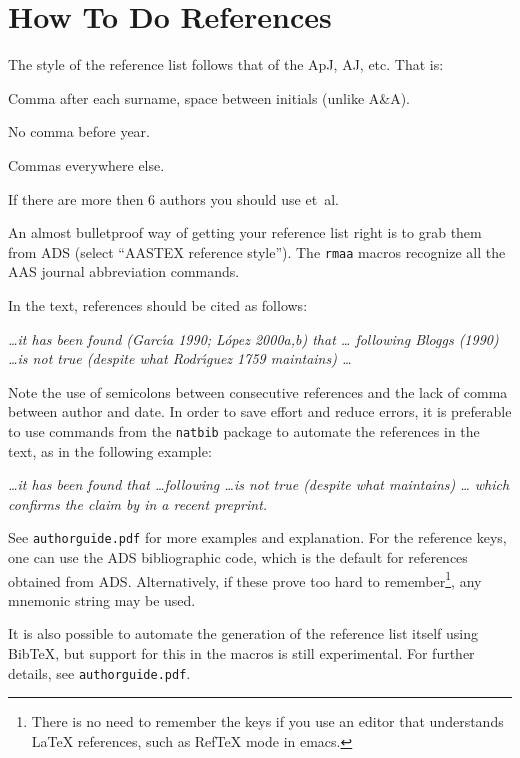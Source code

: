 \documentclass[debug]{rmxaa}
\newenvironment{Example}
{\begin{list}{}{\setlength{\leftmargin}{10pt}\setlength{\rightmargin}{10pt}}%
  \item[]\itshape}
  {\end{list}}
\begin{document}
\section{How To Do References}
\label{sec:refs}

The style of the reference list follows that of the ApJ, AJ, etc. That
is:
\begin{compactitem}
\item Comma after each surname, space between initials (unlike A\&A).
\item No comma before year.
\item Commas everywhere else. 
\item If there are more then 6 authors you should use et~al.
\end{compactitem}
An almost bulletproof way of getting your reference list right is to
grab them from ADS (select ``AASTEX reference style''). The
\texttt{rmaa} macros recognize all the AAS journal abbreviation
commands. 

In the text, references should be cited as follows: 
\begin{Example}
  \dots it has been found (Garc\'\i{}a 1990; L\'opez 2000a,b) that \dots
  following Bloggs (1990) \dots is not true (despite what
  Rodr\'\i{}guez 1759 maintains) \dots
\end{Example}
Note the use of semicolons between consecutive references and the lack
of comma between author and date. In order to save effort and reduce
errors, it is preferable to use commands from the \texttt{natbib}
package to automate the references in the text, as in the following
example:
\begin{Example}
  \dots it has been found \citep{Arthur:2006a, Lazarian:2019a,
    Alarie:2019a} that \dots following \citet{Baldwin:1991a} \dots is
  not true (despite what \citealp{Stromgren:1939a} maintains) \dots
  which confirms the claim by \citeauthor{Chau-Giang:2019a} in a
  recent preprint.
\end{Example}
See \texttt{authorguide.pdf} for more examples and explanation.  For
the reference keys, one can use the ADS bibliographic code, which is
the default for references obtained from ADS. Alternatively, if these
prove too hard to remember\footnote{There is no need to remember the
  keys if you use an editor that understands \LaTeX{} references, such
  as RefTeX mode in emacs.}, any mnemonic string may be used.

It is also possible to automate the generation of the reference list
itself using BibTeX, but support for this in the macros is still
experimental. For further details, see \texttt{authorguide.pdf}.
\end{document}
